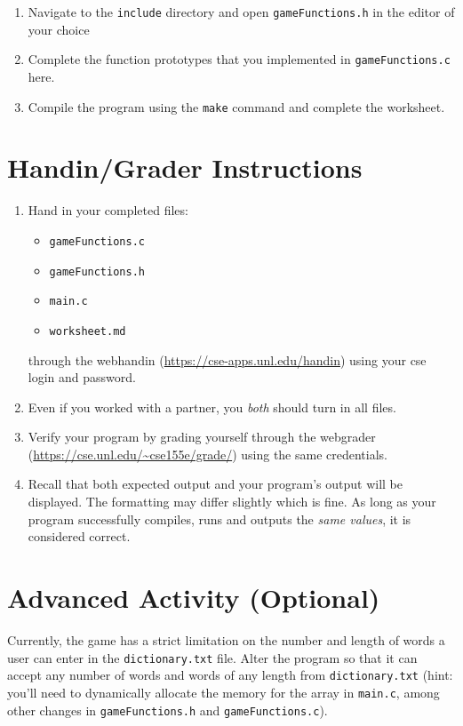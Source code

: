 \documentclass[12pt]{scrartcl}
\begin{document}
\begin{enumerate}
  \item Navigate to the \texttt{include} directory and open 
	\texttt{gameFunctions.h} in the editor of your choice
  \item Complete the function prototypes that you implemented in 
	\texttt{gameFunctions.c} here.  
  \item Compile the program using the \texttt{make} command and 
	complete the worksheet.  
\end{enumerate}

\section{Handin/Grader Instructions}

\begin{enumerate}
  \item Hand in your completed files:
  \begin{itemize}
    \item \texttt{gameFunctions.c}
    \item \texttt{gameFunctions.h}
    \item \texttt{main.c}
    \item \texttt{worksheet.md}
  \end{itemize}
  through the webhandin (\url{https://cse-apps.unl.edu/handin}) 
  using your cse login and password.  
  \item Even if you worked with a partner, you \emph{both} should
  turn in all files.
  \item Verify your program by grading yourself through the
  webgrader (\url{https://cse.unl.edu/~cse155e/grade/}) using the
  same credentials.
  \item Recall that both expected output and your program's output
  will be displayed.  The formatting may differ slightly which is fine.
  As long as your program successfully compiles, runs and outputs 
  the \emph{same values}, it is considered correct.
\end{enumerate}

\section{Advanced Activity (Optional)}

Currently, the game has a strict limitation on the number and length of 
words a user can enter in the \texttt{dictionary.txt} file.  
Alter the program so that it can accept any number of words and words 
of any length from \texttt{dictionary.txt} (hint: you'll 
need to dynamically allocate the memory for the array in 
\texttt{main.c}, among other changes in 
\texttt{gameFunctions.h} and \texttt{gameFunctions.c}).  
\end{document}
